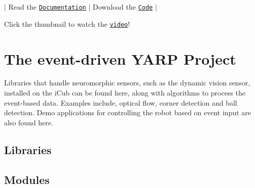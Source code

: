 $\vert$ Read the \href{http://robotology-playground.github.io/event-driven/doxygen/doc/html/index.html}{\tt Documentation} $\vert$ Download the \href{https://github.com/robotology-playground/event-driven}{\tt Code} $\vert$

\href{https://youtu.be/xS-7xYRYSLc}{\tt }  Click the thumbnail to watch the \href{https://youtu.be/xS-7xYRYSLc}{\tt video}!

\section*{The event-\/driven Y\+A\+RP Project}

Libraries that handle neuromorphic sensors, such as the dynamic vision sensor, installed on the i\+Cub can be found here, along with algorithms to process the event-\/based data. Examples include, optical flow, corner detection and ball detection. Demo applications for controlling the robot based on event input are also found here.

\subsection*{Libraries}

\subsection*{Modules}


